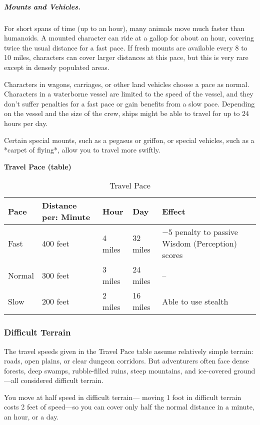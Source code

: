 \subparagraph*{Mounts and Vehicles.} For short spans of time (up to an hour), many animals move much faster than humanoids. A mounted character can ride at a gallop for about an hour, covering twice the usual distance for a fast pace. If fresh mounts are available every 8 to 10 miles, characters can cover larger distances at this pace, but this is very rare except in densely populated areas.

Characters in wagons, carriages, or other land vehicles choose a pace as normal. Characters in a waterborne vessel are limited to the speed of the vessel, and they don't suffer penalties for a fast pace or gain benefits from a slow pace. Depending on the vessel and the size of the crew, ships might be able to travel for up to 24 hours per day.

Certain special mounts, such as a pegasus or griffon, or special vehicles, such as a *carpet of flying*, allow you to travel more swiftly.

\textbf{Travel Pace (table)}

\begin{table}
    \centering
    \begin{tabularx}{\textwidth}{|X|X|X|X|X|}
        \hline
        Pace & Distance per: Minute & Hour & Day & Effect \\\hline
        Fast & 400 feet & 4 miles & 32 miles & $-$5 penalty to passive Wisdom (Perception) scores \\\hline
        Normal & 300 feet & 3 miles & 24 miles & -- \\\hline
        Slow & 200 feet & 2 miles & 16 miles & Able to use stealth \\\hline
    \end{tabularx}
    \caption[Travel]{Travel Pace}
    \label{tbl:travel-pace}
\end{table}

\subsubsection{Difficult Terrain}

The travel speeds given in the Travel Pace table assume relatively simple terrain: roads, open plains, or clear dungeon corridors. But adventurers often face dense forests, deep swamps, rubble-filled ruins, steep mountains, and ice-covered ground—all considered difficult terrain.

You move at half speed in difficult terrain— moving 1 foot in difficult terrain costs 2 feet of speed—so you can cover only half the normal distance in a minute, an hour, or a day.

